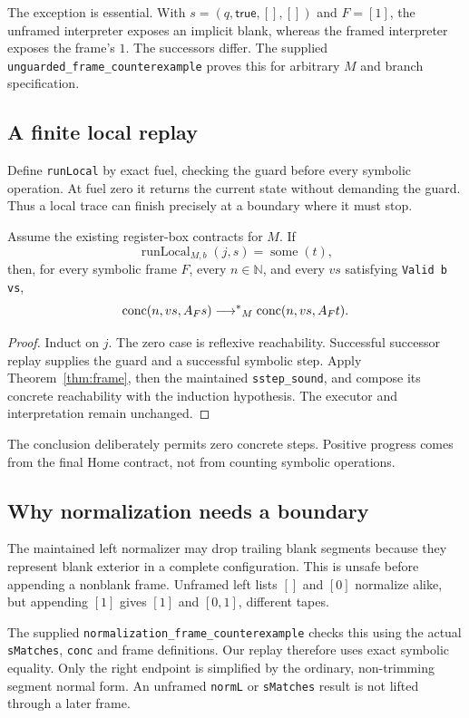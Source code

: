 The exception is essential. With $s=(q,\mathsf{true},[],[])$ and $F=[1]$, the unframed interpreter exposes an implicit blank, whereas the framed interpreter exposes the frame's $1$. The successors differ. The supplied \texttt{unguarded\_frame\_counterexample} proves this for arbitrary $M$ and branch specification.

\subsection{A finite local replay}
Define \texttt{runLocal} by exact fuel, checking the guard before every symbolic operation. At fuel zero it returns the current state without demanding the guard. Thus a local trace can finish precisely at a boundary where it must stop.

\begin{theorem}\label{thm:local}
Assume the existing register-box contracts for $M$. If
\[
 \operatorname{runLocal}_{M,b}(j,s)=\operatorname{some}(t),
\]
then, for every symbolic frame $F$, every $n\in\mathbb N$, and every $vs$ satisfying \texttt{Valid b vs},
\[
 \operatorname{conc}(n,vs,A_Fs)
 \mathrel{\longrightarrow^{*}}_M
 \operatorname{conc}(n,vs,A_Ft).
\]
\end{theorem}
\begin{proof}
Induct on $j$. The zero case is reflexive reachability. Successful successor replay supplies the guard and a successful symbolic step. Apply Theorem~\ref{thm:frame}, then the maintained \texttt{sstep\_sound}, and compose its concrete reachability with the induction hypothesis. The executor and interpretation remain unchanged.
\end{proof}

The conclusion deliberately permits zero concrete steps. Positive progress comes from the final Home contract, not from counting symbolic operations.

\subsection{Why normalization needs a boundary}
The maintained left normalizer may drop trailing blank segments because they represent blank exterior in a complete configuration. This is unsafe before appending a nonblank frame. Unframed left lists $[]$ and $[0]$ normalize alike, but appending $[1]$ gives $[1]$ and $[0,1]$, different tapes.

The supplied \texttt{normalization\_frame\_counterexample} checks this using the actual \texttt{sMatches}, \texttt{conc} and frame definitions. Our replay therefore uses exact symbolic equality. Only the right endpoint is simplified by the ordinary, non-trimming segment normal form. An unframed \texttt{normL} or \texttt{sMatches} result is not lifted through a later frame.

